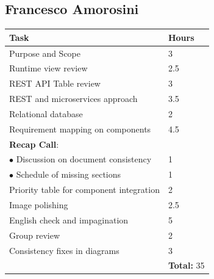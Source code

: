 \documentclass{report}
\begin{document}
\subsection*{Francesco Amorosini}
\begin{table}[!ht]
	\begin{tabular}{|C{.60\textwidth}||C{.20\textwidth}|}
		\toprule
        \textbf{Task} & \textbf{Hours}\\
        \midrule
        Purpose and Scope & 3\\
        \midrule
        Runtime view review & 2.5\\
        \midrule
		REST API Table review & 3\\
        \midrule
        REST and microservices approach & 3.5\\
        \midrule
        Relational database & 2\\
        \midrule
        Requirement mapping on components & 4.5 \\
		\midrule
		\small{\textbf{Recap Call}}: & \\
		\vspace{.2mm}
		$\bullet$ Discussion on document consistency & \vspace{.2mm} 1\\
        $\bullet$ Schedule of missing sections & 1\\
        \midrule
        Priority table for component integration & 2\\
        \midrule
        Image polishing & 2.5 \\
        \midrule
        English check and impagination & 5 \\
        \midrule
        Group review & 2\\
        \midrule
        Consistency fixes in diagrams& 3\\
        \midrule
		& \textbf{Total:} 35\\
		\bottomrule
	\end{tabular}
\end{table}
\clearpage
\end{document}
